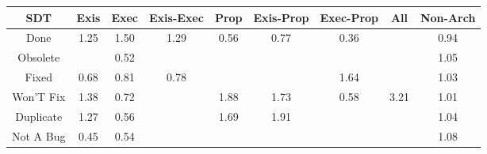 \begin{tabular}{|c||c|c|c|c|c|c|c|c|}
\hline
\hline
SDT & Exis & Exec & Exis-Exec & Prop & Exis-Prop & Exec-Prop & All & Non-Arch \\ 
\hline
Done & \cellcolor[rgb]{0.9016684416997037,0.8360534723840701,0.42} 1.25 & \cellcolor[rgb]{0.8932519521656821,0.8320667141837441,0.42} 1.50 & \cellcolor[rgb]{0.900163742521121,0.8353407201415836,0.42} 1.29 & \cellcolor[rgb]{0.8374897843440985,0.4967849792287329,0.3523237987211586} 0.56 & \cellcolor[rgb]{0.8720366670830155,0.6603068908596068,0.3845675559441478} 0.77 & \cellcolor[rgb]{0.8052072181388648,0.34398083252396,0.3221934035962738} 0.36 &  & \cellcolor[rgb]{0.9000780601533757,0.7930361513926445,0.41073952280981724} 0.94 \\ 
\hline
Obsolete &  & \cellcolor[rgb]{0.8311071887820507,0.466574026901707,0.3463667095299141} 0.52 &  &  &  &  &  & \cellcolor[rgb]{0.908337719460161,0.839212603954813,0.42} 1.05 \\ 
\hline
Fixed & \cellcolor[rgb]{0.8577559304235626,0.5927114040048626,0.37123886839532505} 0.68 & \cellcolor[rgb]{0.8794778562543428,0.6955285196038894,0.39151266583738664} 0.81 & \cellcolor[rgb]{0.8745324375052336,0.6721202041914388,0.3868969416715513} 0.78 &  &  & \cellcolor[rgb]{0.8883863026240096,0.8297619328218993,0.42} 1.64 &  & \cellcolor[rgb]{0.9089842377148961,0.8395188494438981,0.42} 1.03 \\ 
\hline
Won'T Fix & \cellcolor[rgb]{0.8973725384706903,0.8340185708545375,0.42} 1.38 & \cellcolor[rgb]{0.8641819003187561,0.6231276615087784,0.3772364402975056} 0.72 &  & \cellcolor[rgb]{0.8804285123662979,0.8259924532261411,0.42} 1.88 & \cellcolor[rgb]{0.8854003781241521,0.8283475475324931,0.42} 1.73 & \cellcolor[rgb]{0.8407211578527354,0.512080147169614,0.3553397473292197} 0.58 & \cellcolor[rgb]{0.8355901576403097,0.8047532325664625,0.42} 3.21 & \cellcolor[rgb]{0.909557792923147,0.8397905334899116,0.42} 1.01 \\ 
\hline
Duplicate & \cellcolor[rgb]{0.9009995048081042,0.8357366075406809,0.42} 1.27 & \cellcolor[rgb]{0.8367795446545371,0.4934231780314755,0.3516609083442346} 0.56 &  & \cellcolor[rgb]{0.886882046006636,0.8290493902136696,0.42} 1.69 & \cellcolor[rgb]{0.8795074481679437,0.8255561596584996,0.42} 1.91 &  &  & \cellcolor[rgb]{0.9087630674934218,0.8394140846021472,0.42} 1.04 \\ 
\hline
Not A Bug & \cellcolor[rgb]{0.8198638444379853,0.4133555303397967,0.3358729214754529} 0.45 & \cellcolor[rgb]{0.8345865760377305,0.4830431265785905,0.34961413763521504} 0.54 &  &  &  &  &  & \cellcolor[rgb]{0.907387140936567,0.8387623299173211,0.42} 1.08 \\ 

\end{tabular}
